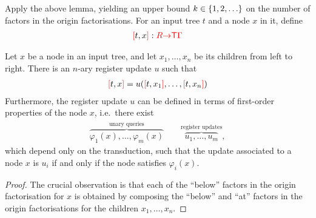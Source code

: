 \newcommand{\sttregval}[2]{\ranked[#1,#2\ranked]}
Apply the above lemma, yielding an upper bound  $k \in \{1,2,\ldots\}$ on the number of factors in the origin factorisations. 
For an input tree $t$ and a node $x$ in it, define 
\begin{align*}
\sttregval t x : \regnames \rto  \tmonad \rGamma
\end{align*}

\begin{lemma}
    Let $x$ be a node in an input tree, and let $x_1,\ldots,x_n$ be its children from left to right. There is an $n$-ary register update $u$ such that 
\begin{align*}
    \sttregval t x = u(\sttregval t {x_1},\ldots, \sttregval t {x_n})
\end{align*}
Furthermore, the register update $u$ can be defined in terms of first-order properties of the node $x$, i.e.~there exist
\begin{align*}
\overbrace{\varphi_1(x),\ldots,\varphi_m(x)}^{\text{unary queries}} \qquad \overbrace{u_1,\ldots,u_m}^{\text{register updates}},
\end{align*}
which depend only on the transduction, such that the update associated to a node $x$ is $u_i$ if and only if the node satisfies $\varphi_i(x)$. 
\end{lemma}
\begin{proof}
    The crucial observation is that each of the ``below'' factors in the origin factorisation for $x$ is obtained by composing  the ``below'' and ``at'' factors in the origin factorisations for the children $x_1,\ldots,x_n$. 
\end{proof}
